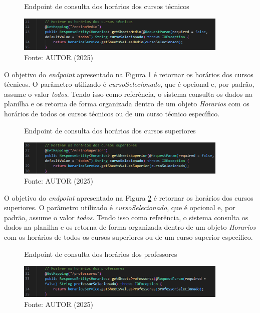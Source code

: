 \begin{itemize}
    \begin{figure}[htb]
        \centering
        \caption{Endpoint de consulta dos horários dos cursos técnicos}
        \includegraphics[width=0.9\textwidth]{Figuras/back-3.png}
        \caption*{Fonte: AUTOR (2025)}
        \label{fig_back_3}
    \end{figure}

    O objetivo do \textit{endpoint} apresentado na Figura \ref{fig_back_3} é retornar os horários dos cursos técnicos. O parâmetro utilizado é \textit{cursoSelecionado}, que é opcional e, por padrão, assume o valor \textit{todos}. Tendo isso como referência, o sistema consulta os dados na planilha e os retorna de forma organizada dentro de um objeto \textit{Horarios} com os horários de todos os cursos técnicos ou de um curso técnico específico.

    \begin{figure}[htb]
        \centering
        \caption{Endpoint de consulta dos horários dos cursos superiores}
        \includegraphics[width=0.9\textwidth]{Figuras/back-4.png}
        \caption*{Fonte: AUTOR (2025)}
        \label{fig_back_4}
    \end{figure}

    O objetivo do \textit{endpoint} apresentado na Figura \ref{fig_back_4} é retornar os horários dos cursos superiores. O parâmetro utilizado é \textit{cursoSelecionado}, que é opcional e, por padrão, assume o valor \textit{todos}. Tendo isso como referência, o sistema consulta os dados na planilha e os retorna de forma organizada dentro de um objeto \textit{Horarios} com os horários de todos os cursos superiores ou de um curso superior específico.

    \begin{figure}[htb]
        \centering
        \caption{Endpoint de consulta dos horários dos professores}
        \includegraphics[width=0.9\textwidth]{Figuras/back-5.png}
        \caption*{Fonte: AUTOR (2025)}
        \label{fig_back_5}
    \end{figure}


\end{itemize}
